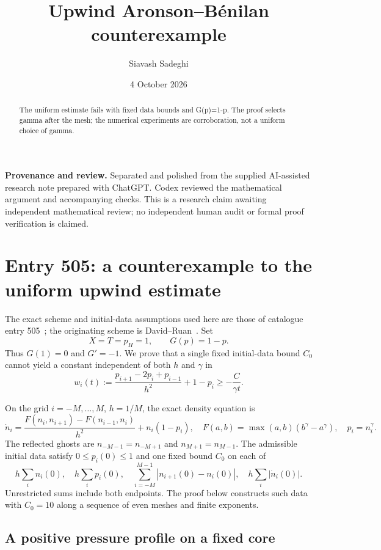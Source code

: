 \documentclass[11pt,a4paper]{article}
\theoremstyle{remark}
\begin{document}
\title{Upwind Aronson--B\'enilan counterexample}
\author{Siavash Sadeghi}
\date{4 October 2026}
\maketitle
\begin{abstract}
The uniform estimate fails with fixed data bounds and G(p)=1-p. The proof selects gamma after the mesh; the numerical experiments are corroboration, not a uniform choice of gamma.
\end{abstract}
\textbf{Provenance and review.} Separated and polished from the supplied AI-assisted research note prepared with ChatGPT. Codex reviewed the mathematical argument and accompanying checks. This is a research claim awaiting independent mathematical review; no independent human audit or formal proof verification is claimed.
\medskip
\section{Entry 505: a counterexample to the uniform upwind estimate}\label{sec:ab}

The exact scheme and initial-data assumptions used here are those of catalogue entry 505~\cite{repo505}; the originating scheme is David--Ruan~\cite{davidruan}. Set
\[
 X=T=p_H=1,\qquad G(p)=1-p.
\]
Thus $G(1)=0$ and $G'=-1$. We prove that a single fixed initial-data bound $C_0$ cannot yield a constant independent of both $h$ and $\gamma$ in
\begin{equation}\label{eq:abtarget}
 w_i(t):=\frac{p_{i+1}-2p_i+p_{i-1}}{h^2}+1-p_i
 \ge -\frac{C}{\gamma t}.
\end{equation}

On the grid $i=-M,\ldots,M$, $h=1/M$, the exact density equation is
\[
 \dot n_i=\frac{F(n_i,n_{i+1})-F(n_{i-1},n_i)}{h^2}+n_i(1-p_i),
 \quad F(a,b)=\max(a,b)(b^\gamma-a^\gamma),\quad p_i=n_i^\gamma.
\]
The reflected ghosts are $n_{-M-1}=n_{-M+1}$ and $n_{M+1}=n_{M-1}$.
The admissible initial data satisfy $0\le p_i(0)\le1$ and one fixed bound
$C_0$ on each of
\[
 h\sum_i n_i(0),\quad h\sum_i p_i(0),\quad
 \sum_{i=-M}^{M-1}|n_{i+1}(0)-n_i(0)|,\quad h\sum_i|\dot n_i(0)|.
\]
Unrestricted sums include both endpoints. The proof below constructs such data
with $C_0=10$ along a sequence of even meshes and finite exponents.

\subsection{A positive pressure profile on a fixed core}
\end{document}
